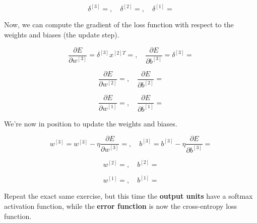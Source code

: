 \documentclass[12pt]{article}
\begin{document}
\begin{enumerate}[leftmargin=\labelsep]
  \begin{equation*}
    \delta^{[3]} = , \quad
    \delta^{[2]} = , \quad
    \delta^{[1]} = 
  \end{equation*}

  Now, we can compute the gradient of the loss function with respect to the
  weights and biases (the update step).

  \begin{equation*}
    \frac{\partial E}{\partial w^{[3]}} = \delta^{[3]} x^{[2]T} = , \quad
    \frac{\partial E}{\partial b^{[3]}} = \delta^{[3]}  = 
  \end{equation*}

  \begin{equation*}
    \frac{\partial E}{\partial w^{[2]}} = , \quad
    \frac{\partial E}{\partial b^{[2]}} = 
  \end{equation*}

  \begin{equation*}
    \frac{\partial E}{\partial w^{[1]}} = , \quad
    \frac{\partial E}{\partial b^{[1]}} = 
  \end{equation*}

  We're now in position to update the weights and biases.

  \begin{equation*}
    w^{[3]} = w^{[3]} - \eta \frac{\partial E}{\partial w^{[3]}} = , \quad
    b^{[3]} = b^{[3]} - \eta \frac{\partial E}{\partial b^{[3]}} = 
  \end{equation*}

  \begin{equation*}
    w^{[2]} = , \quad
    b^{[2]} = 
  \end{equation*}

  \begin{equation*}
    w^{[1]} = , \quad
    b^{[1]} = 
  \end{equation*}

  \begin{tcolorbox}[enhanced jigsaw,colback=bg,boxrule=0pt,arc=1pt,halign=center]
    \item Repeat the exact same exercise, but this time the \textbf{output units}
    have a softmax activation function, while the \textbf{error function} is now
    the cross-entropy loss function.


\end{tcolorbox}
\end{enumerate}
\end{document}

